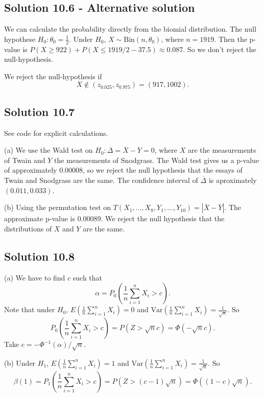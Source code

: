 \subsection*{Solution 10.6 - Alternative solution}

We can calculate the probability directly from the biomial distribution.
The null hypothese $H_0: \theta_0 = \frac{1}{2}$.
Under $H_0$, $X \sim \mathrm{Bin}(n, \theta_0)$, where $n = 1919$.
Then the p-value is $P(X \geq 922) + P(X \leq 1919/2 - 37.5) \approx 0.087$.
So we don't reject the null-hypothesis.

We reject the null-hypothesis if
$$
    X \notin (z_{0.025}, z_{0.975}) = (917, 1002).
$$


\subsection*{Solution 10.7}

See code for explicit calculations.

(a) We use the Wald test on $H_0: \overline{\Delta} = \overline{X} - \overline{Y} = 0$, where $X$ are the measurements of Twain and $Y$ the measurements of Snodgrass.
The Wald test gives us a p-value of approximately $0.00008$, so we reject the null hypothesis that the essays of Twain and Snodgrass are the same.
The confidence interval of $\overline{\Delta}$ is aproximately $(0.011, 0.033)$.

(b) Using the permutation test on $T(X_1, ..., X_8, Y_1, ..., Y_{10}) = |\overline{X} - \overline{Y}|$.
The approximate p-value is $0.00089$.
We reject the null hypothesis that the distributions of $X$ and $Y$ are the same.


\subsection*{Solution 10.8}

(a) We have to find $c$ such that
$$
\alpha = P_0\left(\frac{1}{n}\sum_{i = 1}^n X_i > c\right).
$$
Note that under $H_0$, $E(\frac{1}{n}\sum_{i = 1}^n X_i) = 0$ and $\mathrm{Var}(\frac{1}{n}\sum_{i = 1}^n X_i) = \frac{1}{\sqrt{n}}$.
So
$$
P_0\left(\frac{1}{n} \sum_{i = 1}^n X_i > c\right) = P(Z > \sqrt{n}c) = \Phi(-\sqrt{n}c).
$$
Take $c = -\Phi^{-1}(\alpha)/\sqrt{n}$.

(b) Under $H_1$, $E(\frac{1}{n} \sum_{i = 1}^n X_i) = 1$ and $\mathrm{Var}(\frac{1}{n} \sum_{i = 1}^n X_i) = \frac{1}{\sqrt{n}}$.
So
$$
\beta(1) = P_1\left(\frac{1}{n} \sum_{i = 1}^n X_i > c\right) = P(Z > (c - 1)\sqrt{n}) = \Phi((1 - c)\sqrt{n}).
$$

